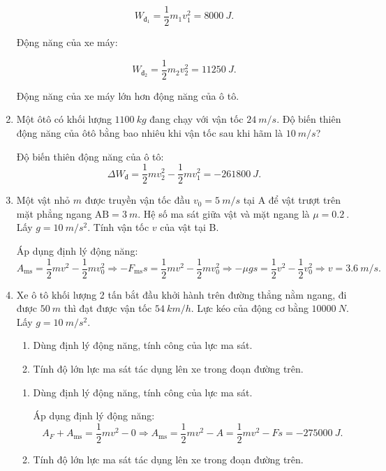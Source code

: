 \begin{enumerate}[label=\bfseries Câu \arabic*:, leftmargin=1.5cm]
{		$$W_{\text{đ}_1} = \dfrac{1}{2}m_1v_1^2 = \SI{8000}{J}.$$
		
		Động năng của xe máy:
		
		$$W_{\text{đ}_2} = \dfrac{1}{2}m_2v_2^2 = \SI{11250}{J}.$$
		
		Động năng của xe máy lớn hơn động năng của ô tô.
	}
	
	\item {}
	
	
	{
		Một ôtô có khối lượng $\SI{1100}{kg}$ đang chạy với vận tốc $\SI{24}{m/s}$. Độ biến thiên động năng của ôtô bằng bao nhiêu khi vận tốc sau khi hãm là $\SI{10}{m/s}$?
		
		
	}
	
	\hideall
	{	
		Độ biến thiên động năng của ô tô:
		$$\Delta W_\text{đ} = \dfrac{1}{2}mv_2^2 - \dfrac{1}{2}mv_1^2 = - \SI{261800}{J}.$$
	}
	
	\item {}
	
	
	{
		Một vật nhỏ $m$ được truyền vận tốc đầu $v_0=\SI{5}{m/s}$ tại A để vật trượt trên mặt phẳng ngang $\text{AB} = \SI{3}{m}$. Hệ số ma sát giữa vật và mặt ngang là $\mu=\SI{0.2}{}$. Lấy $g=\SI{10}{m/s^2}$. Tính vận tốc $v$ của vật tại B.
	}
	
	\hideall
	{	
		Áp dụng định lý động năng:
		$$A_\text{ms} = \dfrac{1}{2}mv^2 - \dfrac{1}{2}mv_0^2 \Rightarrow -F_\text{ms}s = \dfrac{1}{2}mv^2 - \dfrac{1}{2}mv_0^2 \Rightarrow -\mu g s = \dfrac{1}{2}v^2 - \dfrac{1}{2}v_0^2 \Rightarrow v = \SI{3.6}{m/s}.$$
	}

\item {}


{
	Xe ô tô khối lượng 2 tấn bắt đầu khởi hành trên đường thẳng nằm ngang, đi được $\SI{50}{m}$ thì đạt được vận tốc $\SI{54}{km/h}$. Lực kéo của động cơ bằng $\SI{10000}{N}$. Lấy $g=\SI{10}{m/s^2}$.
	\begin{enumerate}[label=\alph*)]
		\item Dùng định lý động năng, tính công của lực ma sát.
		\item Tính độ lớn lực ma sát tác dụng lên xe trong đoạn đường trên.
	\end{enumerate}
}

\hideall
{	
	\begin{enumerate}[label=\alph*)]
		\item Dùng định lý động năng, tính công của lực ma sát.
		
		Áp dụng định lý động năng:
		$$A_F + A_\text{ms} = \dfrac{1}{2}mv^2 - 0 \Rightarrow A_\text{ms} = \dfrac{1}{2}mv^2 - A= \dfrac{1}{2} mv^2 - Fs= \SI{-275000}{J}.$$
		\item Tính độ lớn lực ma sát tác dụng lên xe trong đoạn đường trên.
		

\end{enumerate}}
\end{enumerate}
